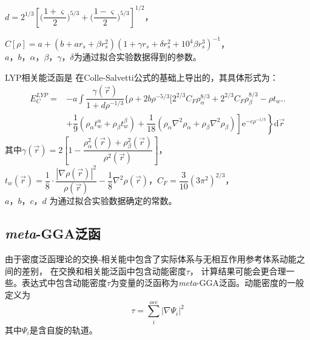$d=2^{1/3}\left[\biggl(\dfrac {1+\varsigma}2\biggr)^{5/3}+\biggl(\dfrac{1-\varsigma}2\biggr)^{5/3}\right]^{1/2}$，

$C[\rho]=a+(b+ar_s+\beta r_s^2)(1+\gamma r_s+\delta r_s^2+10^4\beta r_s^3)^{-1}$，\\%
$a$，$b$，$\alpha$，$\beta$，$\gamma$，$\delta$为通过拟合{实验数据}得到的参数。

LYP相关能泛函是%
{在}Colle-Salvetti公式\cite{TCA37-329_1975}{的基础上}导出的，其具体形式为：
\begin{equation}
  \begin{aligned}
  E_C^{LYP}=&-a\int\dfrac{\gamma(\vec r)}{1+d\rho^{-1/3}}\biggl\{\rho+2b\rho^{-5/3}\biggl[2^{2/3}C_F\rho_{\alpha}^{8/3}+2^{2/3}C_F\rho_{\beta}^{8/3}-\rho t_w\biggr.\biggr.\\
  &+\left.\left.\dfrac19\left(\rho_{\alpha}t_w^{\alpha}+\rho_{\beta}t_w^{\beta}\right)+\dfrac1{18}\left(\rho_{\alpha}\nabla^2\rho_{\alpha}+\rho_{\beta}\nabla^2\rho_{\beta}\right)\right]\textrm{e}^{-c\rho^{-1/3}}\right\}\textrm{d}\vec r
  \end{aligned}
  \label{eq:dft-20}
\end{equation}
其中$\gamma(\vec r)=2\left[1-\dfrac{\rho_{\alpha}^2(\vec r)+\rho_{\beta}^2(\vec r)}{\rho^2(\vec r)}\right]$，$t_w(\vec r)=\dfrac18\cdot\dfrac{|\nabla\rho(\vec r)|^2}{\rho(\vec r)}-\dfrac18\nabla^2\rho(\vec r)$，$C_F=\dfrac3{10}(3\pi^2)^{2/3}$，\\$a$，$b$，$c$，$d$%
{为通过拟合实验数据确定的}常数。

\subsection{\textit{meta}-GGA泛函}
由于密度泛函理论的交换-相关能中包含了实际体系与无相互作用参考体系动能{之}间的差别，%
在交换和相关能泛函中包含动能密度$\tau$，%
计算结果可能会更合理一些。表达式中包含动能密度$\tau$为变量的泛函称为\textit{meta}-GGA泛函。动能密度的一般定义为
\begin{equation}
  \tau=\sum_i^{occ}|\nabla\Psi_i|^2
  \label{eq:dft-21}
\end{equation}
其中$\Psi_i$是含自旋的轨道。

